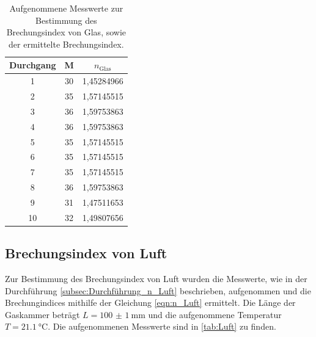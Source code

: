 \begin{table}[H]
  \centering
  \caption{Aufgenommene Messwerte zur Bestimmung des Brechungsindex von Glas, sowie der ermittelte Brechungsindex.}
  \label{tab:Glas}
  \begin{tabular}{c c c}
    \toprule
    Durchgang & M & $n_\text{Glas}$ \\
    \midrule
    1    &   30    &   1,45284966\\
    2    &   35    &   1,57145515\\   
    3    &   36    &   1,59753863\\   
    4    &   36    &   1,59753863\\   
    5    &   35    &   1,57145515\\   
    6    &   35    &   1,57145515\\   
    7    &   35    &   1,57145515\\   
    8    &   36    &   1,59753863\\   
    9    &   31    &   1,47511653\\   
    10   &   32    &   1,49807656\\   
    \bottomrule
  \end{tabular}
\end{table}

\subsection{Brechungsindex von Luft}
\label{subsec:n_Luft}
Zur Bestimmung des Brechungsindex von Luft wurden die Messwerte, wie in der Durchführung \ref{subsec:Durchführung_n_Luft} beschrieben, aufgenommen und 
die Brechungindices mithilfe der Gleichung \eqref{eqn:n_Luft} ermittelt.
Die Länge der Gaskammer beträgt $L = \SI[separate-uncertainty = true]{100(1)}{\milli\metre}$ \cite{anleitung} und die aufgenommene Temperatur $T = \SI{21.1}{\celsius}$.
Die aufgenommenen Messwerte sind in \autoref{tab:Luft} zu finden.

